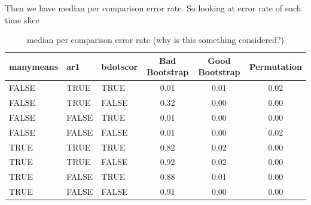 \documentclass{article}
\begin{document}
Then we have median per comparison error rate. So looking at error rate of each time slice

\begin{table}[H]
\centering
\begin{tabular}{lllccc}
  \hline
  manymeans & ar1 & bdotscor &  Bad Bootstrap & Good Bootstrap & Permutation  \\ 
  \hline
FALSE & TRUE & TRUE & 0.01 & 0.01 & 0.02 \\ 
  FALSE & TRUE & FALSE & 0.32 & 0.00 & 0.00 \\ 
  FALSE & FALSE & TRUE & 0.01 & 0.00 & 0.00 \\ 
  FALSE & FALSE & FALSE & 0.01 & 0.00 & 0.02 \\ 
  TRUE & TRUE & TRUE & 0.82 & 0.02 & 0.00 \\ 
  TRUE & TRUE & FALSE & 0.92 & 0.02 & 0.00 \\ 
  TRUE & FALSE & TRUE & 0.88 & 0.01 & 0.00 \\ 
  TRUE & FALSE & FALSE & 0.91 & 0.00 & 0.00 \\ 
\hline
\end{tabular}
\caption{median per comparison error rate (why is this something considered?)}
\end{table}
\end{document}

